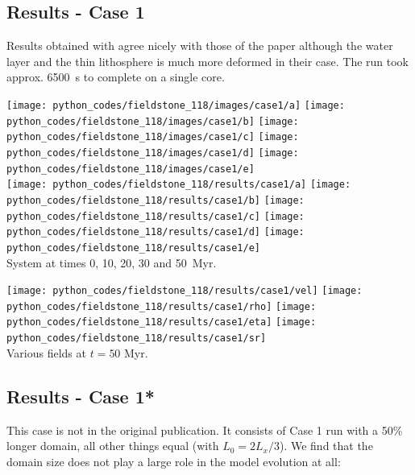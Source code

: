 \newpage

\subsection*{Results - Case 1}

Results obtained with \aspect agree nicely with those of the paper
although the water layer and the thin lithosphere is much more 
deformed in their case. The run took approx. 6500~s to complete on a single core.

\begin{center}
\texttt{[image: python\_codes/fieldstone\_118/images/case1/a]}
\texttt{[image: python\_codes/fieldstone\_118/images/case1/b]}
\texttt{[image: python\_codes/fieldstone\_118/images/case1/c]}
\texttt{[image: python\_codes/fieldstone\_118/images/case1/d]}
\texttt{[image: python\_codes/fieldstone\_118/images/case1/e]}\\
\texttt{[image: python\_codes/fieldstone\_118/results/case1/a]}
\texttt{[image: python\_codes/fieldstone\_118/results/case1/b]}
\texttt{[image: python\_codes/fieldstone\_118/results/case1/c]}
\texttt{[image: python\_codes/fieldstone\_118/results/case1/d]}
\texttt{[image: python\_codes/fieldstone\_118/results/case1/e]}\\
{\captionfont System at times 0, 10, 20, 30 and 50~Myr.}
\end{center}


\begin{center}
\texttt{[image: python\_codes/fieldstone\_118/results/case1/vel]}
\texttt{[image: python\_codes/fieldstone\_118/results/case1/rho]}
\texttt{[image: python\_codes/fieldstone\_118/results/case1/eta]}
\texttt{[image: python\_codes/fieldstone\_118/results/case1/sr]}\\
{\captionfont Various fields at $t=50$ Myr.}
\end{center}

\subsection*{Results - Case 1* }

This case is not in the original publication. It consists of Case 1 run with a 
50\% longer domain, all other things equal (with $L_0=2L_x/3$). We find that the domain size does not
play a large role in the model evolution at all: 

